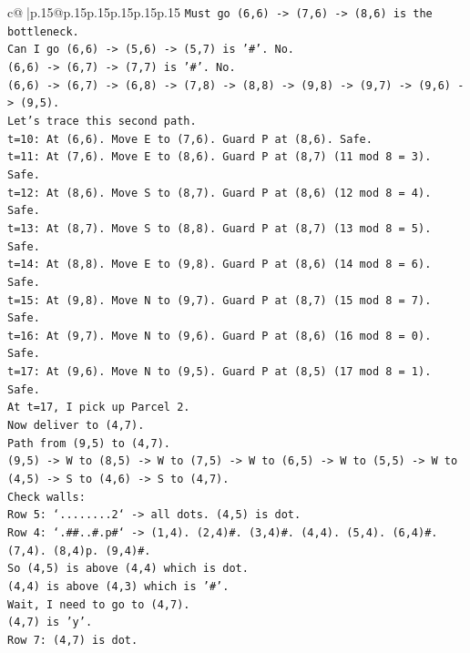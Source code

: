 \documentclass{article}
\begin{document}
{\begin{supertabular}{c@{$\;$}|p{.15\linewidth}@{}p{.15\linewidth}p{.15\linewidth}p{.15\linewidth}p{.15\linewidth}p{.15\linewidth}}
{{{\texttt{Must go (6,6) {-}> (7,6) {-}> (8,6) is the bottleneck.} \\
\texttt{Can I go (6,6) {-}> (5,6) {-}> (5,7) is '\#'. No.} \\
\texttt{(6,6) {-}> (6,7) {-}> (7,7) is '\#'. No.} \\
\texttt{(6,6) {-}> (6,7) {-}> (6,8) {-}> (7,8) {-}> (8,8) {-}> (9,8) {-}> (9,7) {-}> (9,6) {-}> (9,5).} \\
\texttt{Let's trace this second path.} \\
\texttt{t=10: At (6,6). Move E to (7,6). Guard P at (8,6). Safe.} \\
\texttt{t=11: At (7,6). Move E to (8,6). Guard P at (8,7) (11 mod 8 = 3). Safe.} \\
\texttt{t=12: At (8,6). Move S to (8,7). Guard P at (8,6) (12 mod 8 = 4). Safe.} \\
\texttt{t=13: At (8,7). Move S to (8,8). Guard P at (8,7) (13 mod 8 = 5). Safe.} \\
\texttt{t=14: At (8,8). Move E to (9,8). Guard P at (8,6) (14 mod 8 = 6). Safe.} \\
\texttt{t=15: At (9,8). Move N to (9,7). Guard P at (8,7) (15 mod 8 = 7). Safe.} \\
\texttt{t=16: At (9,7). Move N to (9,6). Guard P at (8,6) (16 mod 8 = 0). Safe.} \\
\texttt{t=17: At (9,6). Move N to (9,5). Guard P at (8,5) (17 mod 8 = 1). Safe.} \\
\texttt{At t=17, I pick up Parcel 2.} \\
\texttt{Now deliver to (4,7).} \\
\texttt{Path from (9,5) to (4,7).} \\
\texttt{(9,5) {-}> W to (8,5) {-}> W to (7,5) {-}> W to (6,5) {-}> W to (5,5) {-}> W to (4,5) {-}> S to (4,6) {-}> S to (4,7).} \\
\texttt{Check walls:} \\
\texttt{Row 5: `........2` {-}> all dots. (4,5) is dot.} \\
\texttt{Row 4: `.\#\#..\#.p\#` {-}> (1,4). (2,4)\#. (3,4)\#. (4,4). (5,4). (6,4)\#. (7,4). (8,4)p. (9,4)\#.} \\
\texttt{So (4,5) is above (4,4) which is dot.} \\
\texttt{(4,4) is above (4,3) which is '\#'.} \\
\texttt{Wait, I need to go to (4,7).} \\
\texttt{(4,7) is 'y'.} \\
\texttt{Row 7: (4,7) is dot.} \\
}}}
\end{supertabular}}
\end{document}
